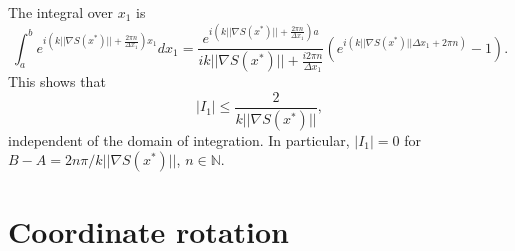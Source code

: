 \documentclass{article}
\newcommand{\norm}[1]{||#1||}
\theoremstyle{plain}
\begin{document}

The integral over $x_1$ is
\begin{equation}
	\int_a^b e^{ i\left( k\norm{\nabla S(x^*)} + \frac{2\pi n}{ \Delta x_1 }\right) x_1 } dx_1
	= \frac{e^{ i\left( k\norm{\nabla S(x^*)} + \frac{2\pi n}{ \Delta x_1 }\right) a } }{ ik\norm{\nabla S(x^*)} + \frac{i2\pi n}{ \Delta x_1 } }
	\left( e^{ i\left( k\norm{\nabla S(x^*)}\Delta x_1 + 2\pi n \right)  } - 1 \right).
\end{equation}
This shows that
\begin{equation}
	|I_1| \leq \frac{2}{k\norm{\nabla S(x^*)}},
\end{equation}
independent of the domain of integration.
In particular, $|I_1| = 0$ for $B-A = 2n\pi / k\norm{\nabla S(x^*)}$, $n\in\mathbb{N}$.





\section{Coordinate rotation}\label{sec_rotation}
\end{document}
